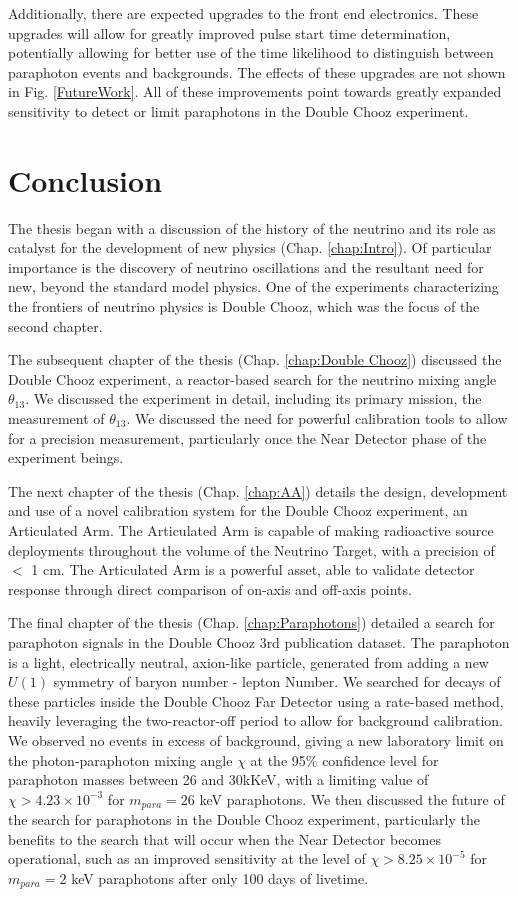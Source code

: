 Additionally, there are expected upgrades to the front end electronics. These upgrades will allow for greatly improved pulse start time determination, potentially allowing for better use of the time likelihood to distinguish between paraphoton events and backgrounds. The effects of these upgrades are not shown in Fig. \ref{FutureWork}.  All of these improvements point towards greatly expanded sensitivity to detect or limit paraphotons in the Double Chooz experiment. 

\newpage

\section{Conclusion}
The thesis began with a discussion of the history of the neutrino and its role as catalyst for the development of new physics (Chap. \ref{chap:Intro}). Of particular importance is the discovery of neutrino oscillations and the resultant need for new, beyond the standard model physics. One of the experiments characterizing the frontiers of neutrino physics is Double Chooz, which was the focus of the second chapter. 

The subsequent chapter of the thesis (Chap. \ref{chap:Double Chooz}) discussed the Double Chooz experiment, a reactor-based search for the neutrino mixing angle $\theta_{13}$. We discussed the experiment in detail, including its primary mission, the measurement of $\theta_{13}$. We discussed the need for powerful calibration tools to allow for a precision measurement, particularly once the Near Detector phase of the experiment beings. 

The next chapter of the thesis (Chap. \ref{chap:AA}) details the design, development and use of a novel calibration system for the Double Chooz experiment, an Articulated Arm. The Articulated Arm is capable of making radioactive source deployments throughout the volume of the Neutrino Target, with a precision of $<$ 1 cm. The Articulated Arm is a powerful asset, able to validate detector response through direct comparison of on-axis and off-axis points. 
 
 The final chapter of the thesis (Chap. \ref{chap:Paraphotons}) detailed a search for paraphoton signals in the Double Chooz 3rd publication dataset. The paraphoton is a light, electrically neutral, axion-like particle, generated from adding a new $U(1)$ symmetry of baryon number - lepton Number. We searched for decays of these particles inside the Double Chooz Far Detector using a rate-based method, heavily leveraging the two-reactor-off period to allow for background calibration. We observed no events in excess of background, giving a new laboratory limit on the photon-paraphoton mixing angle $\chi$ at the 95$\%$ confidence level for paraphoton masses between 26 and 30kKeV, with a limiting value of $\chi > 4.23 \times 10^{-3}$ for $m_{para} =26$ keV paraphotons. We then discussed the future of the search for paraphotons in the Double Chooz experiment, particularly the benefits to the search that will occur when the Near Detector becomes operational, such as an improved sensitivity at the level of $\chi > 8.25 \times 10^{-5}$ for $m_{para} =2$ keV paraphotons after only 100 days of livetime. 

